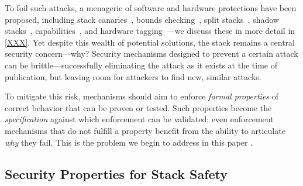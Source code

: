 To foil such attacks, a menagerie of
software and hardware protections have been proposed,
%
including stack canaries~\cite{Cowan+98},
bounds checking~\cite{NagarakatteZMZ09,NagarakatteZMZ10,DeviettiBMZ08},
split stacks~\cite{Kuznetsov+14},
shadow stacks~\cite{Dang+15,Shanbhogue+19},
capabilities~\cite{Woodruff+14,Chisnall+15,SkorstengaardLocal,SkorstengaardSTKJFP,Georges+21},
and hardware tagging~\cite{DBLP:conf/sp/RoesslerD18}---we discuss these in more
detail in \cref{XXX}.
  \ifaftersubmission{}
\fi
%
%
Yet despite this wealth of potential solutions, the stack remains a central
security concern---why?
%
Security mechanisms designed to prevent a certain attack can be brittle---successfully
eliminating the attack as it exists at the time of publication, but leaving room for attackers
to find new, similar attacks.
%

To mitigate this risk,  mechanisms should aim to enforce \emph{formal
properties} of correct  behavior that can be proven or tested. Such properties become the
\emph{specification} against which enforcement can be validated; even enforcement mechanisms that do
not fulfill a property benefit from the ability to articulate \emph{why} they fail.
%
%
This is the problem we begin to address in this paper .

\subsection{Security Properties for Stack Safety}


